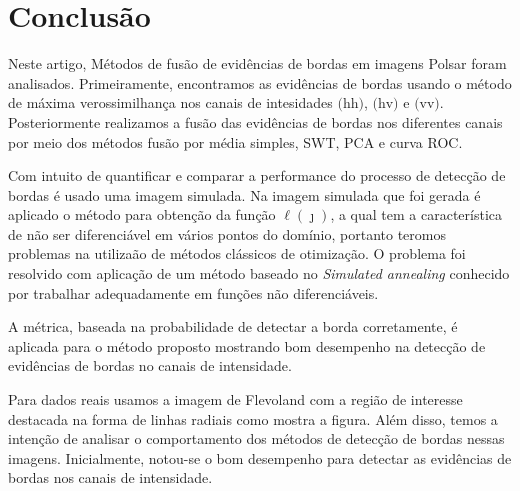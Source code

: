 \documentclass[conference]{IEEEtran}
\begin{document}

\section{Conclusão}\label{sec_08}

Neste artigo, Métodos de fusão de evidências de bordas em imagens Polsar foram analisados. Primeiramente, encontramos as evidências de bordas usando o método de máxima verossimilhança nos canais de intesidades $\text{(hh)}$, $\text{(hv)}$ e $\text{(vv)}$. Posteriormente realizamos a fusão das evidências de bordas nos diferentes canais por meio dos métodos fusão por média simples, SWT, PCA e curva ROC.

Com intuito de quantificar e comparar a performance do processo de detecção de bordas é usado uma imagem simulada. Na imagem simulada que foi gerada é aplicado o método para obtenção  da função $\ell(\jmath)$, a qual tem a característica de não ser diferenciável em vários pontos do domínio, portanto teromos problemas na utilizaão de métodos clássicos de otimização. O problema foi resolvido com aplicação de um método baseado no {\it Simulated annealing} conhecido por trabalhar adequadamente em funções não diferenciáveis.

 A métrica, baseada na probabilidade de detectar a borda corretamente, é aplicada para o método proposto mostrando bom desempenho na detecção de evidências de bordas no canais de intensidade.
  
  Para dados reais usamos a imagem de Flevoland com a região de interesse destacada na forma de linhas radiais como mostra a figura. Além disso, temos a intenção de analisar o comportamento dos métodos de detecção de bordas nessas imagens. Inicialmente, notou-se o bom desempenho para detectar as evidências de bordas nos canais de intensidade.   
   
\end{document}
